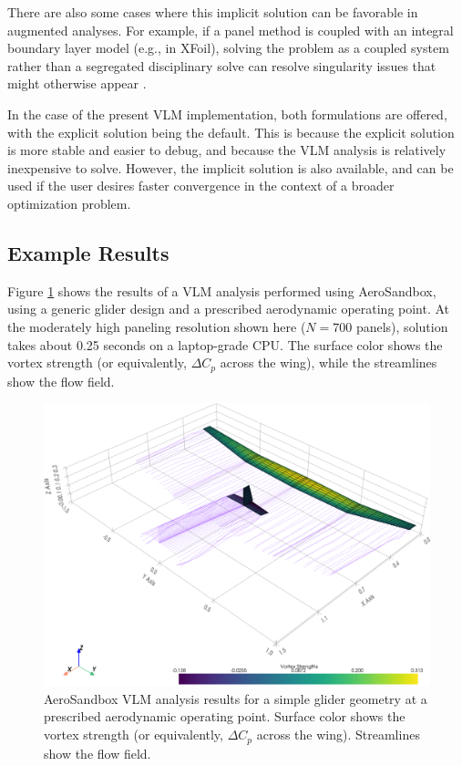 There are also some cases where this implicit solution can be favorable in augmented analyses. For example, if a panel method is coupled with an integral boundary layer model (e.g., in XFoil), solving the problem as a coupled system rather than a segregated disciplinary solve can resolve singularity issues that might otherwise appear \cite{drela_xfoil_1989, drela_viscousinviscid_1987, ranneberg_viiflow_2019, fidkowski_coupled_2022, zhang_threedimensional_2022}.

In the case of the present VLM implementation, both formulations are offered, with the explicit solution being the default. This is because the explicit solution is more stable and easier to debug, and because the VLM analysis is relatively inexpensive to solve. However, the implicit solution is also available, and can be used if the user desires faster convergence in the context of a broader optimization problem.

\subsection{Example Results}

Figure \ref{fig:vlm} shows the results of a VLM analysis performed using AeroSandbox, using a generic glider design and a prescribed aerodynamic operating point. At the moderately high paneling resolution shown here ($N=700$ panels), solution takes about 0.25 seconds on a laptop-grade CPU. The surface color shows the vortex strength (or equivalently, $\Delta C_p$ across the wing), while the streamlines show the flow field.

\begin{figure}[h]
    \centering
    \includegraphics[width=\textwidth]{../figures/vlm.png}
    \caption{AeroSandbox VLM analysis results for a simple glider geometry at a prescribed aerodynamic operating point. Surface color shows the vortex strength (or equivalently, $\Delta C_p$ across the wing). Streamlines show the flow field.}
    \label{fig:vlm}
\end{figure}

